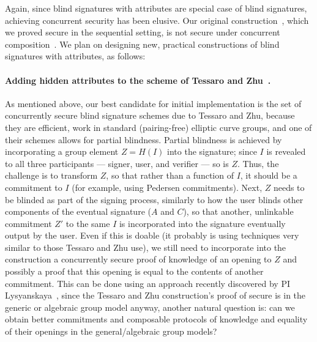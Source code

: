 Again, since blind signatures with attributes are special case of blind signatures, achieving concurrent security has been elusive. Our original construction~\cite{CCS:BalLys13}, which we proved secure in the sequential setting, is not secure under concurrent composition~\cite{EC:BLLOR21}.  We plan on designing new, practical constructions of blind signatures with attributes, as follows:

\paragraph{Adding hidden attributes to the scheme of Tessaro and Zhu~\cite{EC:TesZhu22}.}  As mentioned above, our best candidate for initial implementation is the set of concurrently secure blind signature schemes due to Tessaro and Zhu, because they are efficient, work in standard (pairing-free) elliptic curve groups, and one of their schemes allows for partial blindness.  Partial blindness is achieved by incorporating a group element $Z= H(I)$ into the signature; since $I$ is revealed to all three participants --- signer, user, and verifier --- so is $Z$.  Thus, the challenge is to transform $Z$, so that rather than a function of $I$, it should be a commitment to $I$ (for example, using Pedersen commitments).  Next, $Z$ needs to be blinded as part of the signing process, similarly to how the user blinds other components of the eventual signature ($A$ and $C$), so that another, unlinkable commitment $Z'$ to the same $I$ is incorporated into the signature eventually output by the user.  Even if this is doable (it probably is using techniques very similar to those Tessaro and Zhu use), we still need to incorporate into the construction a concurrently secure proof of knowledge of an opening to $Z$ and possibly a proof that this opening is equal to the contents of another commitment.  This can be done using an approach recently discovered by PI Lysyanskaya~\cite{lysros22}, since the Tessaro and Zhu construction's proof of secure is in the generic or algebraic group model anyway, another natural question is: can we obtain better commitments and composable protocols of knowledge and equality of their openings in the general/algebraic group models?


